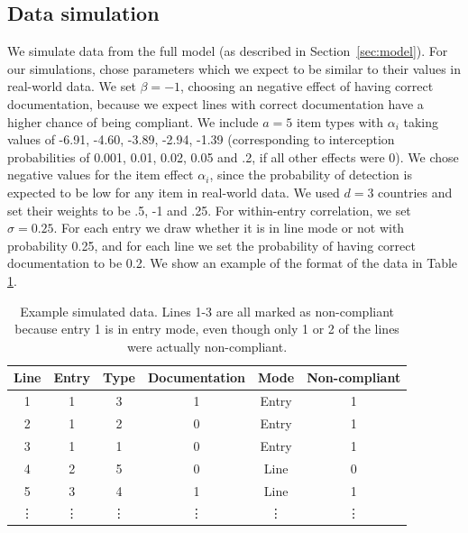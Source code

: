 \documentclass{article}
\begin{document}
\subsection{Data simulation}
We simulate data from the full model (as described in Section~\ref{sec:model}). For our simulations, chose parameters which we expect to be similar to their values in real-world data. We set \(\beta=-1\), choosing an negative effect of having correct documentation, because we expect lines with correct documentation have a higher chance of being compliant. We include $a=5$ item types with \(\alpha_i\) taking values of -6.91, -4.60, -3.89, -2.94, -1.39 (corresponding to interception probabilities of 0.001, 0.01, 0.02, 0.05 and .2, if all other effects were 0). We chose negative values for the item effect $\alpha_i$, since the probability of detection is expected to be low for any item in real-world data. We used $d=3$ countries and set their weights to be .5, -1 and .25.
For within-entry correlation, we set \(\sigma = 0.25\). For each entry we draw whether it is in line mode or not with probability 0.25, and for each line we set the probability of having correct documentation to be 0.2. We show an example of the format of the data in Table \ref{table:example_data}.

\vspace{0.1cm}
\begin{table}[h]
\caption{Example simulated data. Lines 1-3 are all marked as non-compliant because entry 1 is in entry mode, even though only 1 or 2 of the lines were actually non-compliant.}
\label{table:example_data}
\begin{center}

\begin{tabular}{|c|c|c|c|c|c|}
\hline 
Line & Entry & Type & Documentation & Mode & Non-compliant \\ 
\hline 
1 & 1 & 3 & 1  & Entry & 1 \\ 
\hline 
2 & 1 & 2 & 0  & Entry & 1 \\ 
\hline 
3 & 1 & 1 & 0 & Entry & 1 \\ 
\hline 
4 & 2 & 5 & 0 &Line & 0 \\ 
\hline 
5 & 3 & 4 & 1 &Line & 1 \\ 
\hline 
\vdots & \vdots & \vdots & \vdots & \vdots & \vdots \\ 
\hline 
\end{tabular} 

\end{center}
\end{table}
\end{document}
